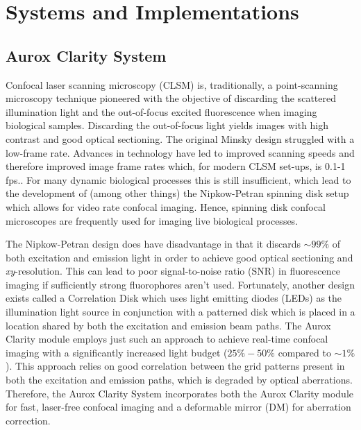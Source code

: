 \chapter{Systems and Implementations}
\label{chpt:sytems}

\section{Aurox Clarity System}
\label{sec:aurox}

Confocal laser scanning microscopy (CLSM) is, traditionally, a point-scanning microscopy technique pioneered with the objective of discarding the scattered illumination light and the out-of-focus excited fluorescence when imaging biological samples.\cite{minsky1988memoir} Discarding the out-of-focus light yields images with high contrast and good optical sectioning.\cite{nwaneshiudu2012introduction} The original Minsky design struggled with a low-frame rate. Advances in technology have led to improved scanning speeds and therefore improved image frame rates which, for modern CLSM set-ups, is 0.1-1 fps.\cite{xiao1988real,schermelleh2010guide}. For many dynamic biological processes this is still insufficient, which lead to the development of (among other things) the Nipkow-Petran spinning disk setup which allows for video rate confocal imaging.\cite{egger1967new,fuseler2018types,tsien1995video} Hence, spinning disk confocal microscopes are frequently used for imaging live biological processes.

The Nipkow-Petran design does have disadvantage in that it discards $\sim99\%$ of both excitation and emission light in order to achieve good optical sectioning and \textit{xy}-resolution.\cite{kino1995intermediate} This can lead to poor signal-to-noise ratio (SNR) in fluorescence imaging if sufficiently strong fluorophores aren't used.\cite{semwogerere2005confocal} Fortunately, another design exists called a Correlation Disk which uses light emitting diodes (LEDs) as the illumination light source in conjunction with a patterned disk which is placed in a location shared by both the excitation and emission beam paths.\cite{juskaitis1996efficient,wilson1996confocal,neil1997method} The Aurox Clarity module employs just such an approach to achieve real-time confocal imaging with a significantly increased light budget ($25\%-50\%$ compared to $\sim1\%$). This approach relies on good correlation between the grid patterns present in both the excitation and emission paths, which is degraded by optical aberrations.\cite{hussain2020sensorless} Therefore, the Aurox Clarity System incorporates both the Aurox Clarity module for fast, laser-free confocal imaging and a deformable mirror (DM) for aberration correction.

